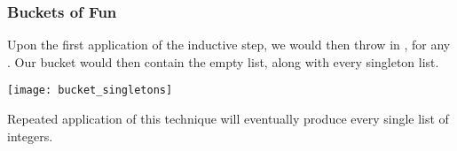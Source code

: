 \documentclass[aspectratio=169]{beamer}
\begin{document}
\begin{frame}[fragile]
  \frametitle{Buckets of Fun}

  \rprs

  Upon the first application of the inductive step, we would then throw in , for any 
  . Our bucket would then contain the empty list, along with every singleton 
  list.

  \pause
  \begin{center} \texttt{[image: bucket\_singletons]} \end{center}

  \pause
  \vspace{\fill}

  Repeated application of this technique will eventually produce every single list of integers. 
\end{frame}
\end{document}
